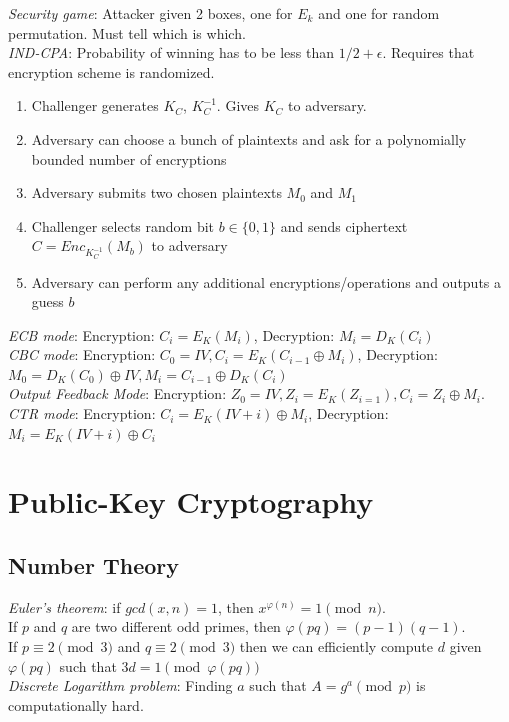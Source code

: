 \documentclass[10pt,landscape]{article}
\newcommand{\totient}{\varphi}
\begin{document}
\begin{multicols}{3}
\textit{Security game}: Attacker given 2 boxes, one for $E_k$ and one for random permutation. Must tell which is which. \\
\textit{IND-CPA}: Probability of winning has to be less than $1/2 + \epsilon$. Requires that encryption scheme is randomized.

\begin{enumerate}
    \item Challenger generates $K_C$, $K_C^{-1}$. Gives $K_C$ to adversary.
    \item Adversary can choose a bunch of plaintexts and ask for a polynomially bounded number of encryptions
    \item Adversary submits two chosen plaintexts $M_0$ and $M_1$
    \item Challenger selects random bit $b\in\{0, 1\}$ and sends ciphertext $C=Enc_{K_C^{-1}}(M_b)$ to adversary
    \item Adversary can perform any additional encryptions/operations and outputs a guess $b$
\end{enumerate}

\textit{ECB mode}: Encryption: $C_i = E_K(M_i)$, Decryption: $M_i = D_K(C_i)$ \\
\textit{CBC mode}: Encryption: $C_0 = IV, C_i = E_K(C_{i-1} \oplus M_i)$, Decryption: $M_0 = D_K(C_0) \oplus IV, M_i = C_{i-1} \oplus D_K(C_i)$ \\
\textit{Output Feedback Mode}: Encryption: $Z_0 = IV, Z_i = E_K(Z_{i=1}), C_i = Z_i \oplus M_i$. \\
\textit{CTR mode}: Encryption: $C_i = E_K(IV + i) \oplus M_i$, Decryption: $M_i = E_K(IV + i) \oplus C_i$

\section{Public-Key Cryptography}

\subsection{Number Theory}

\textit{Euler's theorem}: if $gcd(x, n) = 1$, then $x^{\totient(n)} = 1 \pmod{n}$. \\
If $p$ and $q$ are two different odd primes, then $\totient(pq) = (p-1)(q-1)$. \\
If $p \equiv 2 \pmod{3}$ and $q \equiv 2 \pmod{3}$ then we can efficiently compute $d$ given $\totient(pq)$ such that $3d = 1 \pmod{\totient(pq)}$ \\
\textit{Discrete Logarithm problem}: Finding $a$ such that $A = g^a \pmod{p}$ is computationally hard.


\end{multicols}
\end{document}
